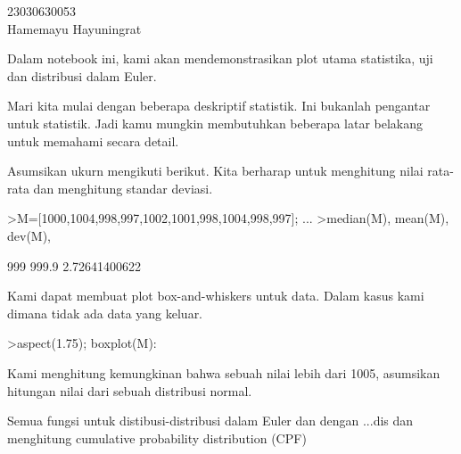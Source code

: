 \documentclass[a4paper,10pt]{article}
\begin{document}
\begin{eulernotebook}
\begin{eulercomment}
23030630053\\
Hamemayu Hayuningrat
\end{eulercomment}
\begin{eulercomment}
Dalam notebook ini, kami akan mendemonstrasikan plot utama statistika,
uji dan distribusi dalam Euler.

Mari kita mulai dengan beberapa deskriptif statistik. Ini bukanlah
pengantar untuk statistik. Jadi kamu mungkin membutuhkan beberapa
latar belakang untuk memahami secara detail.

Asumsikan ukurn mengikuti berikut. Kita berharap untuk menghitung
nilai rata-rata dan menghitung standar deviasi.
\end{eulercomment}
\begin{eulerprompt}
>M=[1000,1004,998,997,1002,1001,998,1004,998,997]; ...
>median(M), mean(M), dev(M),
\end{eulerprompt}
\begin{euleroutput}
  999
  999.9
  2.72641400622
\end{euleroutput}
\begin{eulercomment}
Kami dapat membuat plot box-and-whiskers untuk data. Dalam kasus kami dimana tidak ada
data yang keluar.
\end{eulercomment}
\begin{eulerprompt}
>aspect(1.75); boxplot(M):
\end{eulerprompt}
\begin{eulercomment}
Kami menghitung kemungkinan bahwa sebuah nilai lebih dari 1005, asumsikan hitungan nilai
dari sebuah distribusi normal.

Semua fungsi untuk distibusi-distribusi dalam Euler dan dengan ...dis dan menghitung
cumulative probability distribution (CPF)


\end{eulercomment}
\end{eulernotebook}
\end{document}
